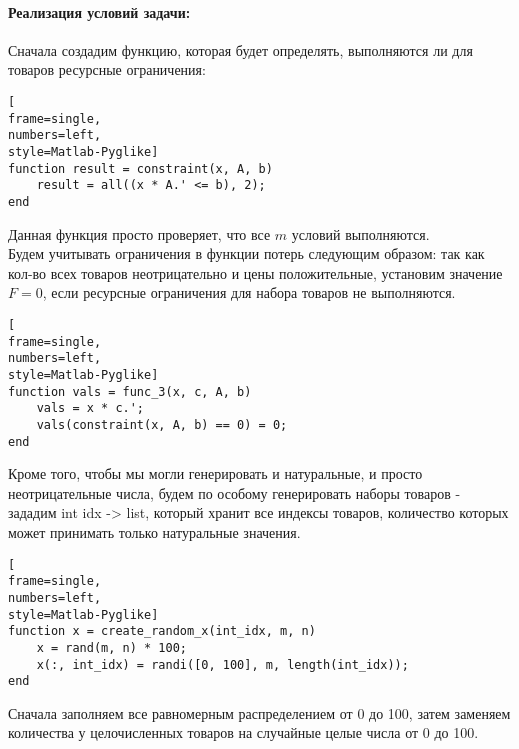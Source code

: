 \documentclass[12pt]{article}
\begin{document}
\paragraph{Реализация условий задачи:} Сначала создадим функцию, которая будет определять, выполняются ли для товаров ресурсные ограничения:
\begin{lstlisting}[
frame=single,
numbers=left,
style=Matlab-Pyglike]
function result = constraint(x, A, b)
    result = all((x * A.' <= b), 2);
end
\end{lstlisting}
Данная функция просто проверяет, что все $m$ условий выполняются. \\
Будем учитывать ограничения в функции потерь следующим образом: так как кол-во всех товаров неотрицательно и цены положительные, установим значение $F = 0$, если ресурсные ограничения для набора товаров не выполняются. 
\begin{lstlisting}[
frame=single,
numbers=left,
style=Matlab-Pyglike]
function vals = func_3(x, c, A, b)
    vals = x * c.';
    vals(constraint(x, A, b) == 0) = 0;
end
\end{lstlisting}
Кроме того, чтобы мы могли генерировать и натуральные, и просто неотрицательные числа, будем по особому генерировать наборы товаров - зададим int idx -> list, который хранит все индексы товаров, количество которых может принимать только натуральные значения. 
\begin{lstlisting}[
frame=single,
numbers=left,
style=Matlab-Pyglike]
function x = create_random_x(int_idx, m, n)
    x = rand(m, n) * 100;
    x(:, int_idx) = randi([0, 100], m, length(int_idx));
end
\end{lstlisting}
Сначала заполняем все равномерным распределением от 0 до 100, затем заменяем количества у целочисленных товаров на случайные целые числа от 0 до 100. 
\end{document}
